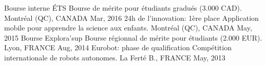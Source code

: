 


\begin{cvhonors}
\cvhonor
{Bourse interne ÉTS} %
{Bourse de mérite pour étudiants gradués (3.000 CAD).} %
{\hspace{-5mm}Montréal (QC), CANADA} %
{Mar, 2016} %
\cvhonor
{24h de l'innovation: 1ère place} %
{Application mobile pour apprendre la science aux enfants.} %
{\hspace{-5mm}Montréal (QC), CANADA} %
{May, 2015} %
\cvhonor
{Bourse Explora'sup} %
{Bourse régionnal de mérite pour étudiants (2.000 EUR).} %
{Lyon, FRANCE} %
{Aug, 2014} %
\cvhonor
{Eurobot: phase de qualification} %
{Compétition internationale de robots autonomes.} %
{La Ferté B., FRANCE} %
{May, 2013} %
\end{cvhonors}

